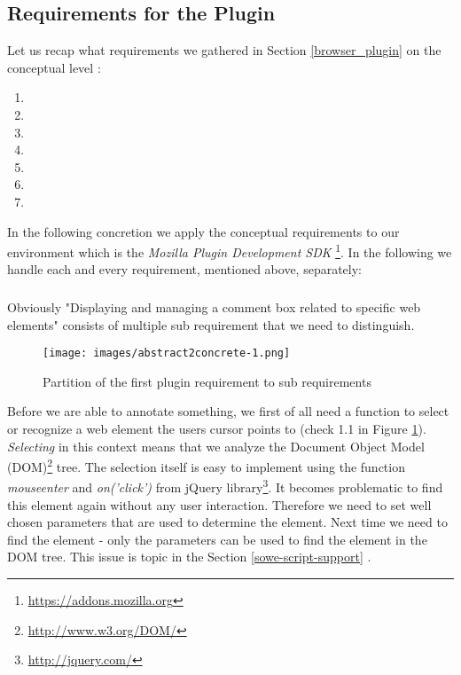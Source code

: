 \newpage
\subsection{Requirements for the Plugin}\label{firefox_plugin_requirements}
Let us recap what requirements we gathered in Section \ref{browser_plugin} on the conceptual level \cite{van2009requirements}:

\begin{enumerate}
\item \reqPi
\item \reqPii
\item \reqPiii
\item \reqPiv
\item \reqPv
\item \reqPvi
\item \reqPvii
\end{enumerate}

In the following concretion we apply the conceptual requirements to our environment which is the \emph{Mozilla Plugin Development SDK} \footnote{\url{https://addons.mozilla.org}}. In the following we handle each and every requirement, mentioned above, separately:

\subsubsection[Visualizing]{\reqPi}\label{display-management-requirement}
Obviously "Displaying and managing a comment box related to specific web elements" consists of multiple sub requirement that we need to distinguish. 

\begin{figure}\centering
		\texttt{[image: images/abstract2concrete-1.png]}
		\caption{Partition of the first plugin requirement to sub requirements}
		\label{abstract2concrete-1}
\end{figure} 

Before we are able to annotate something, we first of all need a function to select or recognize a web element the users cursor points to (check 1.1 in Figure \ref{abstract2concrete-1}). \emph{Selecting} in this context means that we analyze the Document Object Model (DOM)\footnote{\url{http://www.w3.org/DOM/}} tree. The selection itself is easy to implement using the function \emph{mouseenter} and \emph{on('click')} from jQuery library\footnote{\url{http://jquery.com/}}. It becomes problematic to find this element again without any user interaction. Therefore we need to set well chosen parameters that are used to determine the element. Next time we need to find the element - only the parameters can be used to find the element in the DOM tree. This issue is topic in the Section \ref{sowe-script-support} .

